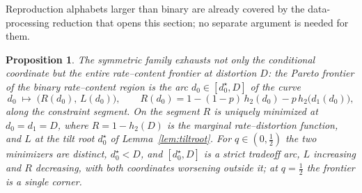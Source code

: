 \documentclass[11pt,onecolumn]{IEEEtran}
\newtheorem{proposition}[theorem]{Proposition}
\begin{document}
Reproduction alphabets larger than binary are already covered by the
data-processing reduction that opens this section; no separate argument
is needed for them.

\begin{proposition}\label{rem:binfrontier}
The symmetric family exhausts not only the conditional coordinate but
the entire rate--content frontier at distortion $D$: the Pareto
frontier of the binary rate--content region is the arc $d_0\in[d_0^\star,D]$
of the curve
\[
d_0\;\longmapsto\;\bigl(R(d_0),\,L(d_0)\bigr),
\qquad
R(d_0)=1-(1-p)\,h_2(d_0)-p\,h_2\bigl(d_1(d_0)\bigr),
\]
along the constraint segment. On the segment $R$ is uniquely minimized
at $d_0=d_1=D$, where $R=1-h_2(D)$ is the marginal rate--distortion
function, and $L$ at the tilt root $d_0^\star$ of
Lemma~\ref{lem:tiltroot}. For $q\in(0,\tfrac12)$ the two minimizers are
distinct, $d_0^\star<D$, and $[d_0^\star,D]$ is a strict tradeoff arc,
$L$ increasing and $R$ decreasing, with both coordinates worsening
outside it; at $q=\tfrac12$ the frontier is a single corner.
\end{proposition}
\end{document}

